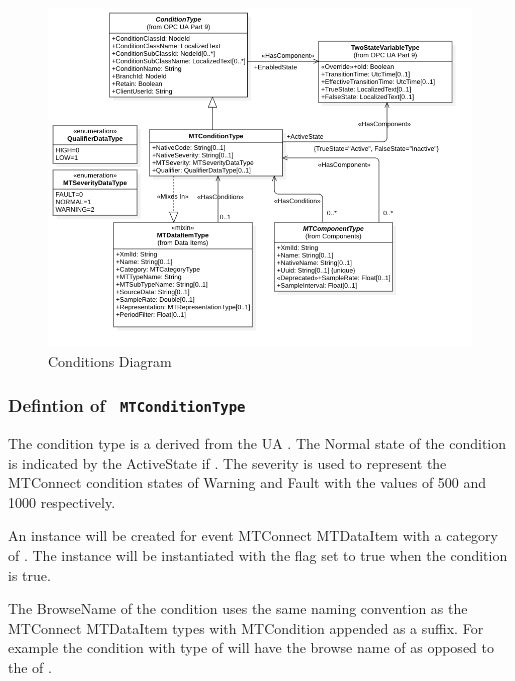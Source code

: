 \begin{figure}[ht]
  \centering
    \includegraphics[width=1.0\textwidth]{./diagrams/types/Conditions.png}
  \caption{Conditions Diagram}
  \label{fig:Conditions}
\end{figure}

\FloatBarrier




\subsubsection{Defintion of \texttt{ MTConditionType}}
  \label{type:MTConditionType}

\FloatBarrier

The condition type is a derived from the UA . The Normal state of 
the condition is indicated by the ActiveState if . The severity 
is used to represent the MTConnect condition states of Warning and Fault with the values of
500 and 1000 respectively. 

An  instance will be created for event MTConnect \gls{MTDataItem} with a 
\gls{category} of . The  instance will be instantiated 
with the  flag set to true when the condition  is true. 

The \gls{BrowseName} of the condition uses the same naming convention as the  MTConnect
\gls{MTDataItem} types with \gls{MTCondition} appended as a suffix. For example the 
condition with \gls{type} of  will have the browse name of 
 as opposed to the  of .

